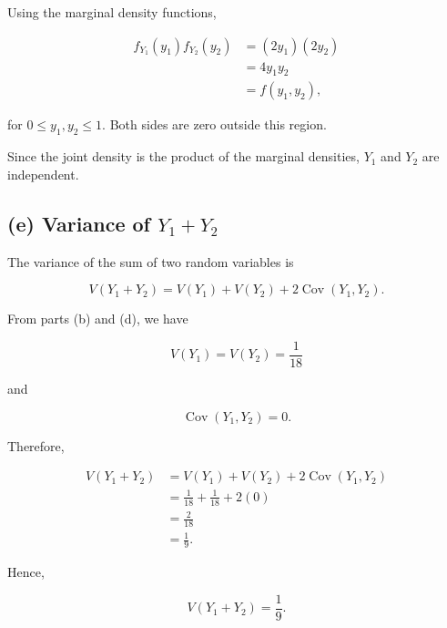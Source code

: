 \documentclass[11pt, a4paper]{article}
\begin{document}
Using the marginal density functions,

\begin{align*}
f_{Y_1}(y_1)f_{Y_2}(y_2)
&= (2y_1)(2y_2)\\
&= 4y_1y_2\\
&= f(y_1,y_2),
\end{align*}

for $0\leq y_1,y_2\leq 1$. Both sides are zero
outside this region.

Since the joint density is the product of the
marginal densities, $Y_1$ and $Y_2$ are independent.

\subsection{(e) Variance of $Y_1+Y_2$}

The variance of the sum of two random variables is

\[
V(Y_1+Y_2)
= V(Y_1)+V(Y_2)
+2\operatorname{Cov}(Y_1,Y_2).
\]

From parts (b) and (d), we have

\[
V(Y_1)=V(Y_2)=\frac{1}{18}
\]

and

\[
\operatorname{Cov}(Y_1,Y_2)=0.
\]

Therefore,

\begin{align*}
V(Y_1+Y_2)
&= V(Y_1)+V(Y_2)
+2\operatorname{Cov}(Y_1,Y_2)\\
&= \frac{1}{18}+\frac{1}{18}+2(0)\\
&= \frac{2}{18}\\
&= \frac{1}{9}.
\end{align*}

Hence,

\[
V(Y_1+Y_2)=\frac{1}{9}.
\]
\end{document}
